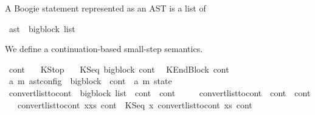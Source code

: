 \begin{isabellebody}
\begin{isamarkuptext}%
A Boogie statement represented as an AST is a list of %
\end{isamarkuptext}\isamarkuptrue%
\isamarkupfalse%
\ ast\ {\isacharequal}{\kern0pt}\ {\isachardoublequoteopen}bigblock\ list{\isachardoublequoteclose}%
\isadelimdocument
%
\endisadelimdocument
%
\isatagdocument
%
\isamarkuptrue%
%
\endisatagdocument
{\isafolddocument}%
%
\isadelimdocument
%
\endisadelimdocument
%
\begin{isamarkuptext}%
We define a continuation-based small-step semantics.%
\end{isamarkuptext}\isamarkuptrue%
\isamarkupfalse%
\ cont\ \isanewline
\ {\isacharequal}{\kern0pt}\ KStop\ \isanewline
\ {\isacharbar}{\kern0pt}\ KSeq\ {\isachardoublequoteopen}bigblock{\isachardoublequoteclose}\ cont\isanewline
\ {\isacharbar}{\kern0pt}\ KEndBlock\ cont\ \isanewline
\isanewline
{}\isamarkupfalse%
\ {\isacharparenleft}{\kern0pt}{\isacharprime}{\kern0pt}a{\isacharcomma}{\kern0pt}\ {\isacharprime}{\kern0pt}m{\isacharparenright}{\kern0pt}\ ast{\isacharunderscore}{\kern0pt}config\ {\isacharequal}{\kern0pt}\ {\isachardoublequoteopen}bigblock\ {\isacharasterisk}{\kern0pt}\ cont\ {\isacharasterisk}{\kern0pt}\ {\isacharparenleft}{\kern0pt}{\isacharparenleft}{\kern0pt}{\isacharprime}{\kern0pt}a{\isacharcomma}{\kern0pt}\ {\isacharprime}{\kern0pt}m{\isacharparenright}{\kern0pt}\ state{\isacharparenright}{\kern0pt}{\isachardoublequoteclose}\isanewline
\isanewline
{}\isamarkupfalse%
\ convert{\isacharunderscore}{\kern0pt}list{\isacharunderscore}{\kern0pt}to{\isacharunderscore}{\kern0pt}cont\ {\isacharcolon}{\kern0pt}{\isacharcolon}{\kern0pt}\ {\isachardoublequoteopen}bigblock\ list\ {\isasymRightarrow}\ cont\ {\isasymRightarrow}\ cont{\isachardoublequoteclose}\ \isanewline
\ \ \ \ {\isachardoublequoteopen}convert{\isacharunderscore}{\kern0pt}list{\isacharunderscore}{\kern0pt}to{\isacharunderscore}{\kern0pt}cont\ {\isacharbrackleft}{\kern0pt}{\isacharbrackright}{\kern0pt}\ cont{}\ {\isacharequal}{\kern0pt}\ cont{}{\isachardoublequoteclose}\isanewline
\ \ {\isacharbar}{\kern0pt}\ {\isachardoublequoteopen}convert{\isacharunderscore}{\kern0pt}list{\isacharunderscore}{\kern0pt}to{\isacharunderscore}{\kern0pt}cont\ {\isacharparenleft}{\kern0pt}x{\isacharhash}{\kern0pt}xs{\isacharparenright}{\kern0pt}\ cont{}\ {\isacharequal}{\kern0pt}\ KSeq\ x\ {\isacharparenleft}{\kern0pt}convert{\isacharunderscore}{\kern0pt}list{\isacharunderscore}{\kern0pt}to{\isacharunderscore}{\kern0pt}cont\ xs\ cont{}{\isacharparenright}{\kern0pt}{\isachardoublequoteclose}%

\end{isabellebody}

